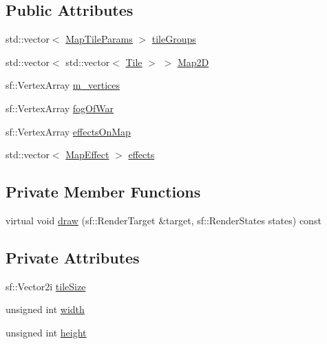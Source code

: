 \subsection*{Public Attributes}
\begin{DoxyCompactItemize}
\item 
std\+::vector$<$ \mbox{\hyperlink{_map_8hpp_a970bf0518d4d28fb59d97d608760830c}{Map\+Tile\+Params}} $>$ \mbox{\hyperlink{class_map_a0f73f48de7a6630b79042eb7e768368b}{tile\+Groups}}
\item 
std\+::vector$<$ std\+::vector$<$ \mbox{\hyperlink{class_tile}{Tile}} $>$ $>$ \mbox{\hyperlink{class_map_a39daf9803dc6303f981da4d74884741b}{Map2D}}
\item 
sf\+::\+Vertex\+Array \mbox{\hyperlink{class_map_ab2c144cd773a1d9d4ac37c74d6b0c375}{m\+\_\+vertices}}
\item 
sf\+::\+Vertex\+Array \mbox{\hyperlink{class_map_a8fbf8baf352b7fc264ef2b9376c4c16d}{fog\+Of\+War}}
\item 
sf\+::\+Vertex\+Array \mbox{\hyperlink{class_map_a6352a58a99b4ff693ae9cd3fabc34862}{effects\+On\+Map}}
\item 
std\+::vector$<$ \mbox{\hyperlink{class_map_effect}{Map\+Effect}} $>$ \mbox{\hyperlink{class_map_adba7c06f06362ce22f16be96a723dcaf}{effects}}
\end{DoxyCompactItemize}
\subsection*{Private Member Functions}
\begin{DoxyCompactItemize}
\item 
virtual void \mbox{\hyperlink{class_map_ab78fd8c747e184be9b86b993a60ca00b}{draw}} (sf\+::\+Render\+Target \&target, sf\+::\+Render\+States states) const
\end{DoxyCompactItemize}
\subsection*{Private Attributes}
\begin{DoxyCompactItemize}
\item 
sf\+::\+Vector2i \mbox{\hyperlink{class_map_a1777f71edba289ab1e891492d651a491}{tile\+Size}}
\item 
unsigned int \mbox{\hyperlink{class_map_aa510a987349c68df39475a3a217bd733}{width}}
\item 
unsigned int \mbox{\hyperlink{class_map_a39bb864cb5e1d1e609396a2f3559602e}{height}}
\end{DoxyCompactItemize}


